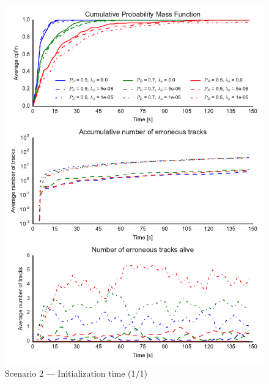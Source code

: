 
\begin{figure}
\centering
\includegraphics{Figures/plots/Scenario2_Init-Time(1-1).pdf}
\caption{Scenario 2 --- Initialization time (1/1)}\label{fig:init2_time_1-1}
\end{figure}


